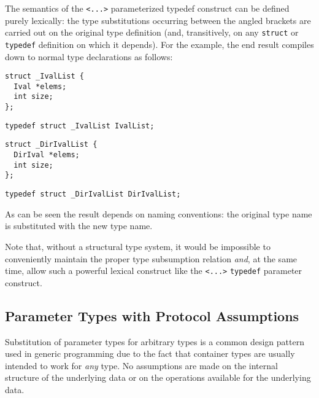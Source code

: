 \documentclass{sigplanconf}
\begin{document}
The semantics of the \verb+<...>+ parameterized typedef construct can
be defined purely lexically: the type substitutions occurring between
the angled brackets are carried out on the original type definition
(and, transitively, on any \verb+struct+ or \verb+typedef+ definition
on which it depends).
For the example, the end result compiles down to normal type
declarations as follows:
\begin{samepage}
\begin{verbatim}
struct _IvalList {
  Ival *elems;
  int size;
};
\end{verbatim}
\end{samepage}
\begin{samepage}
\begin{verbatim}
typedef struct _IvalList IvalList;
\end{verbatim}
\end{samepage}
\begin{samepage}
\begin{verbatim}
struct _DirIvalList {
  DirIval *elems;
  int size;
};
\end{verbatim}
\end{samepage}
\begin{samepage}
\begin{verbatim}
typedef struct _DirIvalList DirIvalList;
\end{verbatim}
\end{samepage}
As can be seen the result depends on naming conventions: the original
type name is substituted with the new type name.

Note that, without a structural type system, it would be impossible to
conveniently maintain the proper type subsumption relation \emph{and},
at the same time, allow such a powerful lexical construct like the
\verb+<...>+ \verb+typedef+ parameter construct.

\subsection{Parameter Types with Protocol Assumptions}

Substitution of parameter types for arbitrary types is a common design
pattern used in generic programming due to the fact that container
types are usually intended to work for \emph{any} type. No assumptions
are made on the internal structure of the underlying data or on the
operations available for the underlying data.
\end{document}
